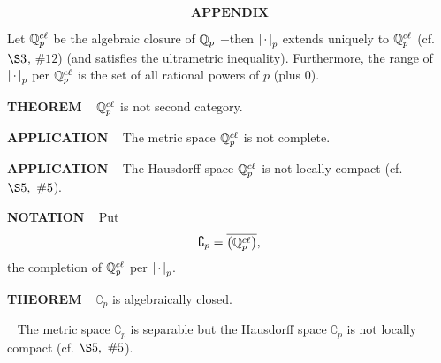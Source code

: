 \[
\textbf{APPENDIX}
\]
\setcounter{theoremn}{0}

\indent Let $\mathbb{Q}_p^{c\ell}$ be the algebraic closure of $\mathbb{Q}_p$ 
$-$then $\left\vert\hspace{0.05cm} \cdot \hspace{0.05cm}\right\vert_p$ extends uniquely to $\mathbb{Q}_p^{c\ell}$ (cf. $\S 3$,  $\# 12$) (and satisfies the ultrametric inequality).  Furthermore, the range of $\left\vert\hspace{0.05cm} \cdot \hspace{0.05cm}\right\vert_p$ per $\mathbb{Q}_p^{c\ell}$ is the set of all rational powers of $p$ (plus 0).\\

\begin{x}{\small\bf THEOREM} \ %
$\mathbb{Q}_p^{c\ell}$ is not second category.\\
\end{x}
\vspace{0.1cm}

\begin{x}{\small\bf APPLICATION} \ %
The metric space $\mathbb{Q}_p^{c\ell}$ is not complete.\\
\end{x}
\vspace{0.1cm}

\begin{x}{\small\bf APPLICATION} \ %
The Hausdorff space $\mathbb{Q}_p^{c\ell}$ is not locally compact (cf. $\S5, \  \#5$).\\
\end{x}
\vspace{0.1cm}

\begin{x}{\small\bf NOTATION} \ %
Put
\[
\complement_p = \overline{\bigl(\Q_p^{c\ell}\bigr)}, \index{$\complement_p$}
\]
the completion of $\mathbb{Q}_p^{c\ell}$ per $\left\vert\hspace{0.05cm} \cdot \hspace{0.05cm}\right\vert_p$.\\
\end{x}
\vspace{0.1cm}

\begin{x}{\small\bf THEOREM} \ %
$\complement_p$ is algebraically closed.\\
\end{x}
\vspace{0.1cm}

\begin{x}{\small\bf {}} \ %
The metric space $\complement_p$ is separable but the Hausdorff space 
$\complement_p$ is not locally compact (cf. $\S5, \  \#5$).\\
\end{x}























